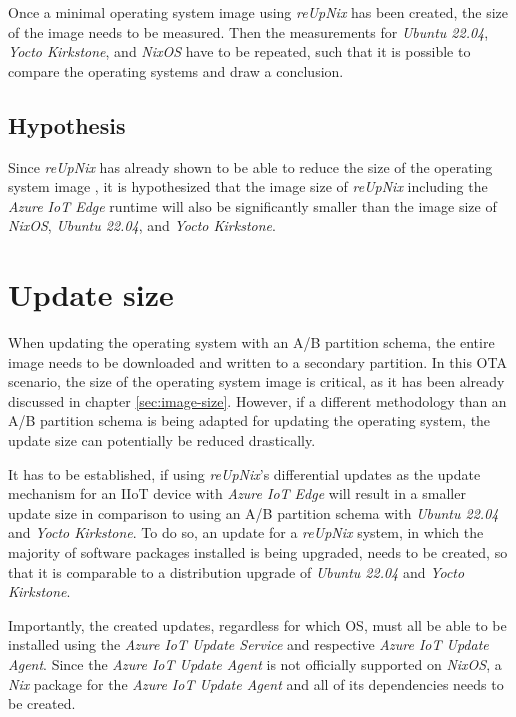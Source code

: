 Once a minimal operating system image using \textit{reUpNix} has been created, the size of the image
needs to be measured. Then the measurements for
\textit{Ubuntu 22.04}, \textit{Yocto Kirkstone}, and \textit{NixOS} have to be repeated, such that
it is possible to compare the operating systems and draw a conclusion.

\subsection{Hypothesis}
Since \textit{reUpNix} has already shown to be able to reduce the size of the
operating system image \cite{gollenstede:23:lctes}, it is hypothesized that the
image size of \textit{reUpNix} including the \textit{Azure IoT Edge} runtime
will also be significantly smaller than the image size of \textit{NixOS},
\textit{Ubuntu 22.04}, and \textit{Yocto Kirkstone}.


\section{Update size}
\label{sec:update-size}
When updating the operating system with an A/B partition schema, the entire
image needs to be downloaded and written to a secondary partition. In this
\ac{OTA} scenario, the size of the operating system image is critical, as it has been
already discussed in chapter \ref{sec:image-size}.
However, if a different methodology than an A/B partition schema is being adapted
for updating the operating system, the update size can potentially be reduced 
drastically.

It has to be established, if using \textit{reUpNix}'s differential updates as the
update mechanism for an \ac{IIoT} device with \textit{Azure IoT Edge}
will result in a smaller update size in comparison to using an A/B partition schema with
\textit{Ubuntu 22.04} and \textit{Yocto Kirkstone}. To do so, an update for a \textit{reUpNix} system, 
in which the majority of software packages installed is being upgraded, needs to be created, so that it is comparable 
to a distribution upgrade of \textit{Ubuntu 22.04} and \textit{Yocto Kirkstone}.

Importantly, the created updates, regardless for which \ac{OS}, must all be
able to be installed using the \textit{Azure IoT Update Service} and respective
\textit{Azure IoT Update Agent}. Since the \textit{Azure IoT Update Agent} is
not officially supported on \textit{NixOS}, a \textit{Nix} package
for the \textit{Azure IoT Update Agent} and all of its dependencies needs to be created.

